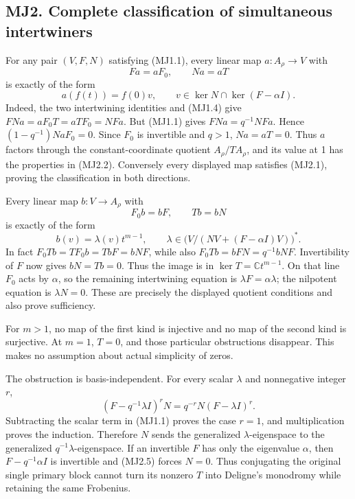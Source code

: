 \subsection{MJ2. Complete classification of simultaneous
intertwiners}\label{mj2.-complete-classification-of-simultaneous-intertwiners}

For any pair \((V,F,N)\) satisfying (MJ1.1), every linear map
\(a:A_\rho\to V\) with \[
Fa=aF_0,\qquad Na=aT
\tag{MJ2.1}
\] is exactly of the form \[
a(f(t))=f(0)v,\qquad v\in\ker N\cap\ker(F-\alpha I).
\tag{MJ2.2}
\] Indeed, the two intertwining identities and (MJ1.4) give
\(FNa=aF_0T=aTF_0=NFa\). But (MJ1.1) gives \(FNa=q^{-1}NFa\). Hence
\((1-q^{-1})NaF_0=0\). Since \(F_0\) is invertible and \(q>1\),
\(Na=aT=0\). Thus \(a\) factors through the constant-coordinate quotient
\(A_\rho/TA_\rho\), and its value at 1 has the properties in (MJ2.2).
Conversely every displayed map satisfies (MJ2.1), proving the
classification in both directions.

Every linear map \(b:V\to A_\rho\) with \[
F_0b=bF,\qquad Tb=bN
\tag{MJ2.3}
\] is exactly of the form \[
b(v)=\lambda(v)t^{m-1},\qquad
\lambda\in\bigl(V/(NV+(F-\alpha I)V)\bigr)^*.
\tag{MJ2.4}
\] In fact \(F_0Tb=TF_0b=TbF=bNF\), while also \(F_0Tb=bFN=q^{-1}bNF\).
Invertibility of \(F\) now gives \(bN=Tb=0\). Thus the image is in
\(\ker T=\mathbb Ct^{m-1}\). On that line \(F_0\) acts by \(\alpha\), so
the remaining intertwining equation is \(\lambda F=\alpha\lambda\); the
nilpotent equation is \(\lambda N=0\). These are precisely the displayed
quotient conditions and also prove sufficiency.

For \(m>1\), no map of the first kind is injective and no map of the
second kind is surjective. At \(m=1\), \(T=0\), and those particular
obstructions disappear. This makes no assumption about actual simplicity
of zeros.

The obstruction is basis-independent. For every scalar \(\lambda\) and
nonnegative integer \(r\), \[
(F-q^{-1}\lambda I)^rN=q^{-r}N(F-\lambda I)^r.
\tag{MJ2.5}
\] Subtracting the scalar term in (MJ1.1) proves the case \(r=1\), and
multiplication proves the induction. Therefore \(N\) sends the
generalized \(\lambda\)-eigenspace to the generalized
\(q^{-1}\lambda\)-eigenspace. If an invertible \(F\) has only the
eigenvalue \(\alpha\), then \(F-q^{-1}\alpha I\) is invertible and
(MJ2.5) forces \(N=0\). Thus conjugating the original single primary
block cannot turn its nonzero \(T\) into Deligne's monodromy while
retaining the same Frobenius.


